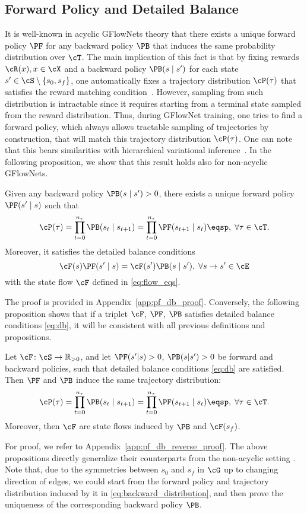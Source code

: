 \subsection{Forward Policy and Detailed Balance}
It is well-known in acyclic GFlowNets theory \cite{bengio2023gflownet} that there exists a unique forward policy $\PF$ for any backward policy $\PB$ that induces the same probability distribution over $\cT$. The main implication of this fact is that by fixing rewards $\cR(x), x \in \cX$ and a backward policy $\PB(s \mid s')$ for each state $s' \in \cS \setminus \{s_0, s_f\}$, one automatically fixes a trajectory distribution $\cP(\tau)$ that satisfies the reward matching condition~\cite{malkin2022trajectory}. However, sampling from such distribution is intractable since it requires starting from a terminal state sampled from the reward distribution. Thus, during GFlowNet training, one tries to find a forward policy, which always allows tractable sampling of trajectories by construction, that will match this trajectory distribution $\cP(\tau)$. One can note that this bears similarities with hierarchical variational inference~\cite{malkin2023gflownets}. In the following proposition, we show that this result holds also for non-acyclic GFlowNets.

\begin{proposition}\label{th:pf_db}
Given any backward policy $\PB(s \mid s') > 0$, there exists a unique forward policy $\PF(s' \mid s)$ such that
$$
\cP(\tau) = \prod_{t = 0}^{n_\tau} \PB(s_t \mid s_{t + 1}) = \prod_{t = 0}^{n_\tau} \PF(s_{t+1} \mid s_{t})\eqsp, \; \forall \tau \in \cT.
$$
Moreover, it satisfies the detailed balance conditions
$$
\cF(s)\PF(s' \mid s) = \cF(s')\PB(s \mid s'), \; \forall s \to s' \in \cE
$$
with the state flow $\cF$ defined in \eqref{eq:flow_eqs}. 
\end{proposition}
The proof is provided in Appendix~\ref{app:pf_db_proof}. Conversely, the following proposition shows that if a triplet $\cF$, $\PF$, $\PB$ satisfies detailed balance conditions \eqref{eq:db}, it will be consistent with all previous definitions and propositions.
\begin{proposition}\label{th:pf_db_reverse}
Let $\cF\colon \cS \to \mathbb{R}_{>0}$, and let $\PF(s'|s) > 0$, $\PB(s|s') > 0$ be forward and backward policies, such that detailed balance conditions \eqref{eq:db} are satisfied. Then $\PF$ and $\PB$ induce the same trajectory distribution:
$$
\cP(\tau) = \prod_{t = 0}^{n_\tau} \PB(s_t \mid s_{t + 1}) = \prod_{t = 0}^{n_\tau} \PF(s_{t+1} \mid s_{t})\eqsp, \; \forall \tau \in \cT.
$$
Moreover, then $\cF$ are state flows induced by $\PB$ and $\cF(s_f)$.
\end{proposition}
 For proof, we refer to Appendix~\ref{app:pf_db_reverse_proof}. The above propositions directly generalize their counterparts from the non-acyclic setting \cite{bengio2023gflownet}. Note that, due to the symmetries between $s_0$ and $s_f$ in $\cG$ up to changing direction of edges, we could start from the forward policy and trajectory distribution induced by it in \eqref{eq:backward_distribution}, and then prove the uniqueness of the corresponding backward policy $\PB$. 

